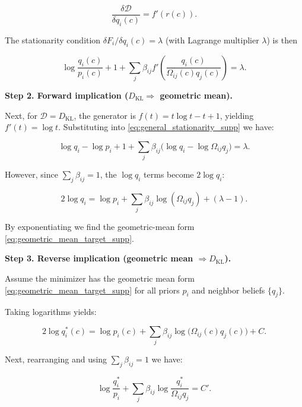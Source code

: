 \documentclass[twoside,11pt]{article}
\begin{document}
\begin{equation}
\frac{\delta\mathcal{D}}{\delta q_i(c)} = f'(r(c)).
\end{equation}

The stationarity condition $\delta F_i/\delta q_i(c)=\lambda$ (with Lagrange multiplier $\lambda$) is then

\begin{equation}
\log\frac{q_i(c)}{p_i(c)} + 1
+ \sum_j \beta_{ij} f' \left(\frac{q_i(c)}{\Omega_{ij}(c) q_j(c)}\right) = \lambda.
\label{eq:general_stationarity_supp}
\end{equation}

\textbf{Step 2. Forward implication ($D_{\mathrm{KL}}\Rightarrow$ geometric mean).}

Next, for $\mathcal{D}=D_{\mathrm{KL}}$, the generator is $f(t)=t\log t - t + 1$, yielding $f'(t)=\log t$. Substituting into \eqref{eq:general_stationarity_supp} we have:

\[
\log q_i - \log p_i + 1 + \sum_j \beta_{ij}\bigl(\log q_i - \log\Omega_{ij}q_j\bigr) = \lambda.
\]

However, since $\sum_j\beta_{ij}=1$, the $\log q_i$ terms become $2\log q_i$:

\[
2\log q_i = \log p_i + \sum_j\beta_{ij}\log(\Omega_{ij}q_j) + (\lambda - 1).
\]

By exponentiating we find the geometric-mean form \eqref{eq:geometric_mean_target_supp}.

\textbf{Step 3. Reverse implication (geometric mean $\Rightarrow D_{\mathrm{KL}}$).}

Assume the minimizer has the geometric mean form \eqref{eq:geometric_mean_target_supp} for all priors $p_i$ and neighbor beliefs $\{q_j\}$.

Taking logarithms yields:

\begin{equation}
2\log q_i^*(c) = \log p_i(c) + \sum_j\beta_{ij}\log\bigl(\Omega_{ij}(c) q_j(c)\bigr) + C.
\label{eq:log_target_supp}
\end{equation}

Next, rearranging and using $\sum_j\beta_{ij}=1$ we have:

\begin{equation}
\log\frac{q_i^*}{p_i} + \sum_j\beta_{ij}\log\frac{q_i^*}{\Omega_{ij}q_j} = C'.
\label{eq:rearranged_target_supp}
\end{equation}
\end{document}

